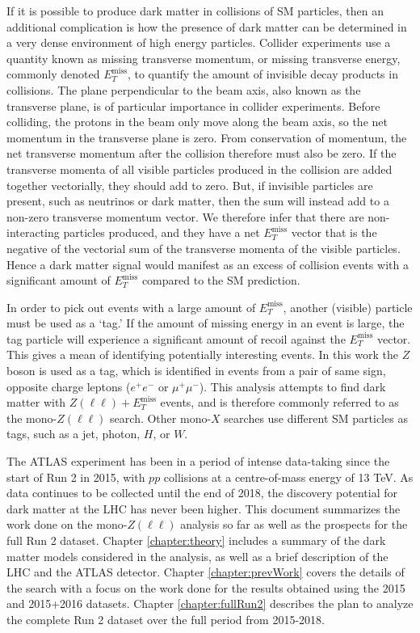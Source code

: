 If it is possible to produce dark matter in collisions of SM particles, then an additional complication is how the presence of dark matter can be determined in a very dense environment of high energy particles. Collider experiments use a quantity known as missing transverse momentum, or missing transverse energy, commonly denoted $E_T^\text{miss}$, to quantify the amount of invisible decay products in collisions. The plane perpendicular to the beam axis, also known as the transverse plane, is of particular importance in collider experiments. Before colliding, the protons in the beam only move along the beam axis, so the net momentum in the transverse plane is zero. From conservation of momentum, the net transverse momentum after the collision therefore must also be zero. If the transverse momenta of all visible particles produced in the collision are added together vectorially, they should add to zero. But, if invisible particles are present, such as neutrinos or dark matter, then the sum will instead add to a non-zero transverse momentum vector. We therefore infer that there are non-interacting particles produced, and they have a net $E_T^\text{miss}$ vector that is the negative of the vectorial sum of the transverse momenta of the visible particles. Hence a dark matter signal would manifest as an excess of collision events with a significant amount of $E_T^\text{miss}$ compared to the SM prediction.

In order to pick out events with a large amount of $E_T^\text{miss}$, another (visible) particle must be used as a `tag.' If the amount of missing energy in an event is large, the tag particle will experience a significant amount of recoil against the $E_T^\text{miss}$ vector. This gives a mean of identifying potentially interesting events. In this work the $Z$ boson is used as a tag, which is identified in events from a pair of same sign, opposite charge leptons ($e^+ e^-$ or $\mu^+ \mu^-$). This analysis attempts to find dark matter with $Z(\ell\ell)+E_T^\text{miss}$ events, and is therefore commonly referred to as the mono-$Z(\ell\ell)$ search. Other mono-$X$ searches use different SM particles as tags, such as a jet, photon, $H$, or $W$.

The ATLAS experiment has been in a period of intense data-taking since the start of Run 2 in 2015, with $pp$ collisions at a centre-of-mass energy of 13 TeV. As data continues to be collected until the end of 2018, the discovery potential for dark matter at the LHC has never been higher. This document summarizes the work done on the mono-$Z(\ell\ell)$ analysis so far as well as the prospects for the full Run 2 dataset. Chapter \ref{chapter:theory} includes a summary of the dark matter models considered in the analysis, as well as a brief description of the LHC and the ATLAS detector. Chapter \ref{chapter:prevWork} covers the details of the search with a focus on the work done for the results obtained using the 2015 and 2015+2016 datasets. Chapter \ref{chapter:fullRun2} describes the plan to analyze the complete Run 2 dataset over the full period from 2015-2018.


